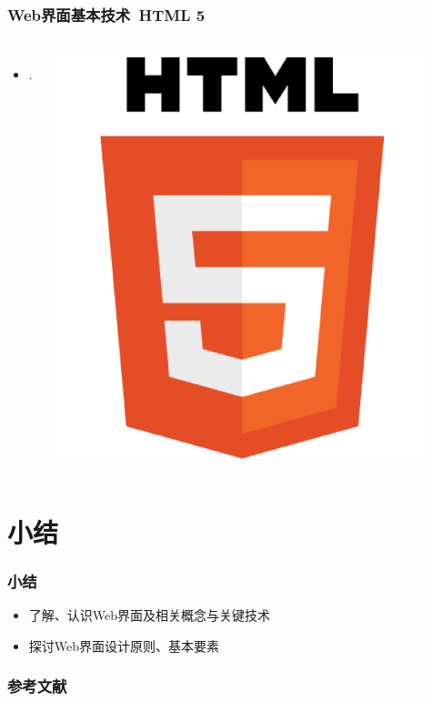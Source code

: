 \documentclass{beamer}
\begin{document}
\begin{frame}
	\frametitle{Web界面基本技术~{\small HTML 5}}
	\beamertemplatetransparentcovereddynamicmedium
	\begin{columns}
	\begin{itemize}[<+->]
		\item .
	\end{itemize}
	\includegraphics[width=0.9\textwidth]{images/html-5.png}
	\end{columns}
\end{frame}

\section{小结}
\begin{frame}
	\frametitle{小结}
	\begin{itemize}
		\item 了解、认识Web界面及相关概念与关键技术
		\item 探讨Web界面设计原则、基本要素
	\end{itemize}
\end{frame}

\begin{frame}
	\frametitle{参考文献}
	
	
\end{frame}
\end{document}
